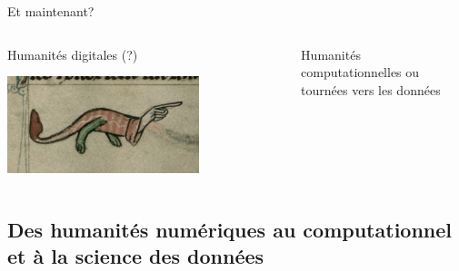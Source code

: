 \documentclass[ignorenonframetext]{beamer}
\begin{document}
\begin{frame}{Et maintenant?}

\begin{columns}
	\begin{column}{0.45\textwidth}
		\Large Humanités digitales (?)
		
		\centering
		
		\includegraphics[width=0.7\textwidth]{img/manicule07.jpg}
	\end{column}
	\begin{column}{0.45\textwidth}
		\Large Humanités computationnelles ou tournées vers les données
	\end{column}
\end{columns}

\end{frame}


\subsection{Des humanités numériques au computationnel et à la science des données}
\end{document}
